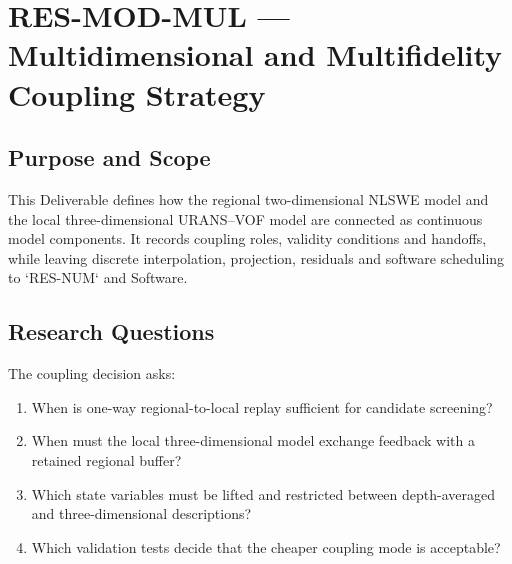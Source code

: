 
\section{RES-MOD-MUL --- Multidimensional and Multifidelity Coupling Strategy}
\label{sec:res-mod-mul}

\subsection{Purpose and Scope}
\label{sec:res-mod-mul-purpose}


This Deliverable defines how the regional two-dimensional NLSWE model
and the local three-dimensional URANS--VOF model are connected as
continuous model components. It records coupling roles, validity
conditions and handoffs, while leaving discrete interpolation,
projection, residuals and software scheduling to `RES-NUM` and
Software.

\subsection{Research Questions}
\label{sec:res-mod-mul-research-questions}


The coupling decision asks:

\begin{enumerate}
  \item When is one-way regional-to-local replay sufficient for
    candidate screening?
  \item When must the local three-dimensional model exchange feedback
    with a retained regional buffer?
  \item Which state variables must be lifted and restricted between
    depth-averaged and three-dimensional descriptions?
  \item Which validation tests decide that the cheaper coupling mode is
    acceptable?
\end{enumerate}

